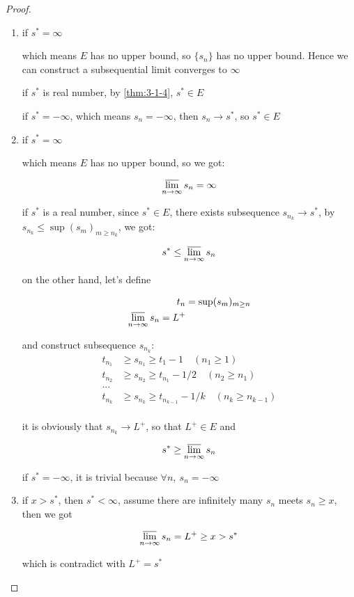 \begin{proof}
    \begin{enumerate}
        \item if $s^* = \infty$ 

        which means $E$ has no upper bound, so $\{ s_n \}$ has no upper bound. Hence
        we can construct a subsequential limit converges to $\infty$

        if $s^*$ is real number, by \autoref{thm:3-1-4}, $s^* \in E$

        if $s^* = -\infty$, which means $s_n = -\infty$, then $s_n \to s^*$, so $s^* \in E$

        \item if $s^* = \infty$


        which means $E$ has no upper bound, so we got:

        \[
            \varlimsup_{n \to \infty} s_n = \infty
        \]

        if $s^*$ is a real number, since $s^* \in E$, there exists subsequence $s_{n_k} \to s^*$, by
        $s_{n_k} \le \sup (s_m)_{m \ge n_k}$, we got:

        \[
            s^* \le \varlimsup_{n \to \infty} s_n
        \]

        on the other hand, let's define 

        \begin{align*}
            t_n &= \sup (s_m)_{m \ge n} \\
            \varlimsup_{n \to \infty}s_n = L^+
        \end{align*}

        and construct subsequence $s_{n_k}$:
        \begin{align*}
            t_{n_1} & \ge s_{n_1}  \ge t_1 - 1\quad (n_1 \ge 1) \\
            t_{n_2} & \ge s_{n_2}  \ge t_{n_1} - 1/2 \quad (n_2 \ge n_1) \\
            ... \\
            t_{n_k} & \ge s_{n_k}  \ge t_{n_{k-1}} - 1/k \quad (n_k \ge n_{k-1}) \\
        \end{align*}

        it is obviously that $s_{n_k} \to L^+$, so that $L^+ \in E$ and

        \[
            s^* \ge \varlimsup_{n \to \infty} s_n
        \]


        if $s^* = -\infty$, it is trivial because $\forall n,\: s_n = -\infty$

        \item if $x > s^*$, then $s^* < \infty$, assume there are infinitely many $s_n$ meets $s_n \ge x$,
        then we got

        \[
            \varlimsup_{n \to  \infty} s_n = L^+ \ge x > s^*
        \]

        which is contradict with $L^+ = s^*$
    \end{enumerate}
\end{proof}

